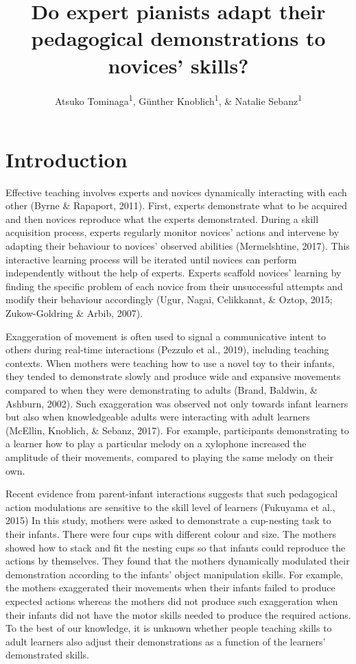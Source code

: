 \documentclass[
  man,floatsintext]{apa6}
\title{Do expert pianists adapt their pedagogical demonstrations to novices' skills?}
\author{Atsuko Tominaga\textsuperscript{1}, Günther Knoblich\textsuperscript{1}, \& Natalie Sebanz\textsuperscript{1}}
\date{}
\affiliation{\vspace{0.5cm}\textsuperscript{1} Department of Cognitive Science, Central European University}
\begin{document}
\maketitle

\hypertarget{introduction}{%
\section{Introduction}\label{introduction}}

Effective teaching involves experts and novices dynamically interacting with each other (Byrne \& Rapaport, 2011). First, experts demonstrate what to be acquired and then novices reproduce what the experts demonstrated. During a skill acquisition process, experts regularly monitor novices' actions and intervene by adapting their behaviour to novices' observed abilities (Mermelshtine, 2017). This interactive learning process will be iterated until novices can perform independently without the help of experts. Experts scaffold novices' learning by finding the specific problem of each novice from their unsuccessful attempts and modify their behaviour accordingly (Ugur, Nagai, Celikkanat, \& Oztop, 2015; Zukow-Goldring \& Arbib, 2007).

Exaggeration of movement is often used to signal a communicative intent to others during real-time interactions (Pezzulo et al., 2019), including teaching contexts. When mothers were teaching how to use a novel toy to their infants, they tended to demonstrate slowly and produce wide and expansive movements compared to when they were demonstrating to adults (Brand, Baldwin, \& Ashburn, 2002). Such exaggeration was observed not only towards infant learners but also when knowledgeable adults were interacting with adult learners (McEllin, Knoblich, \& Sebanz, 2017). For example, participants demonstrating to a learner how to play a particular melody on a xylophone increased the amplitude of their movements, compared to playing the same melody on their own.

Recent evidence from parent-infant interactions suggests that such pedagogical action modulations are sensitive to the skill level of learners (Fukuyama et al., 2015) In this study, mothers were asked to demonstrate a cup-nesting task to their infants. There were four cups with different colour and size. The mothers showed how to stack and fit the nesting cups so that infants could reproduce the actions by themselves. They found that the mothers dynamically modulated their demonstration according to the infants' object manipulation skills. For example, the mothers exaggerated their movements when their infants failed to produce expected actions whereas the mothers did not produce such exaggeration when their infants did not have the motor skills needed to produce the required actions. To the best of our knowledge, it is unknown whether people teaching skills to adult learners also adjust their demonstrations as a function of the learners' demonstrated skills.
\end{document}

